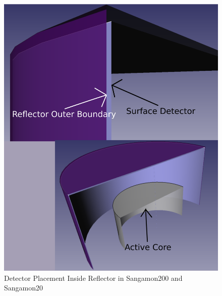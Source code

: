\begin{figure}[H]
\centering
\includegraphics[width=0.6\linewidth]{figures/detector-layoutv3.png}
\caption{Detector Placement Inside Reflector in Sangamon200 and Sangamon20}
\label{fig:det-place}
\end{figure}